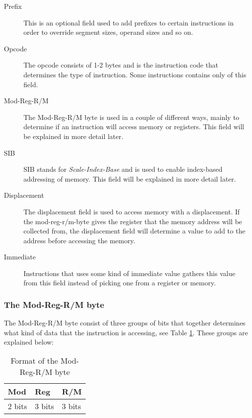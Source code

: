 \documentclass[11pt,twoside]{eitExjobb}
\begin{document}
\begin{description}
\item[Prefix] This is an optional field used to add prefixes to certain instructions in order to override segment sizes, operand sizes and so on.
\item[Opcode] The opcode consists of 1-2 bytes and is the instruction code that determines the type of instruction. Some instructions contains only of this field.
\item[Mod-Reg-R/M] The Mod-Reg-R/M byte is used in a couple of different ways, mainly to determine if an instruction will access memory or registers. This field will be explained in more detail later.  
\item[SIB] SIB stands for \emph{Scale-Index-Base} and is used to enable index-based addressing of memory. This field will be explained in more detail later.
\item[Displacement] The displacement field is used to access memory with a displacement. If the mod-reg-r/m-byte gives the register that the memory address will be collected from, the displacement field will determine a value to add to the address before accessing the memory.
\item[Immediate] Instructions that uses some kind of immediate value gathers this value from this field instead of picking one from a register or memory.
\end{description}

\subsubsection{The Mod-Reg-R/M byte}
The Mod-Reg-R/M byte consist of three groups of bits that together determines what kind of data that the instruction is accessing, see Table \ref{table:modregrmbyte}. These groups are explained below:\\

\begin{table}[h]
\begin{tabular}{|l|l|l|}
\hline
Mod & Reg & R/M \\
\hline
2 bits & 3 bits & 3 bits \\
\hline
\end{tabular}
\caption{Format of the Mod-Reg-R/M byte}
\label{table:modregrmbyte}
\end{table}
\end{document}
